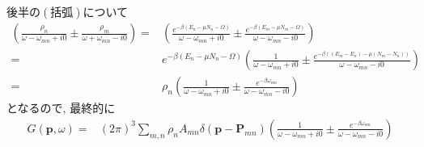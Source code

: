 \documentclass[platex, a4j, 9pt, dvipdfmx]{jsarticle}
\begin{document}
後半の$(\text{括弧})$について
\begin{align}
    \left(\frac{\rho_n}{\omega-\omega_{mn}+i0}\pm\frac{\rho_m}{\omega+\omega_{mn}-i0}\right) =& \left(\frac{e^{-\beta(E_n-\mu N_n-\Omega)}}{\omega-\omega_{mn}+i0}\pm\frac{e^{-\beta(E_m-\mu N_m-\Omega)}}{\omega-\omega_{mn}-i0}\right) \\
    =& e^{-\beta(E_n-\mu N_n-\Omega)}\left(\frac{1}{\omega-\omega_{mn}+i0}\pm\frac{e^{-\beta((E_m-E_n)-\mu (N_m-N_n))}}{\omega-\omega_{mn}-i0}\right) \\
    =& \rho_{n}\left(\frac{1}{\omega-\omega_{mn}+i0}\pm\frac{e^{-\beta\omega_{mn}}}{\omega-\omega_{mn}-i0}\right)
\end{align}
となるので, 最終的に
\begin{align}
    G(\bm{p},\omega) =& (2\pi)^3\sum_{m,n}\rho_{n}A_{mn}\delta(\bm{p}-\bm{P}_{mn})\left(\frac{1}{\omega-\omega_{mn}+i0}\pm\frac{e^{-\beta\omega_{mn}}}{\omega-\omega_{mn}-i0}\right)
\end{align}
\end{document}
